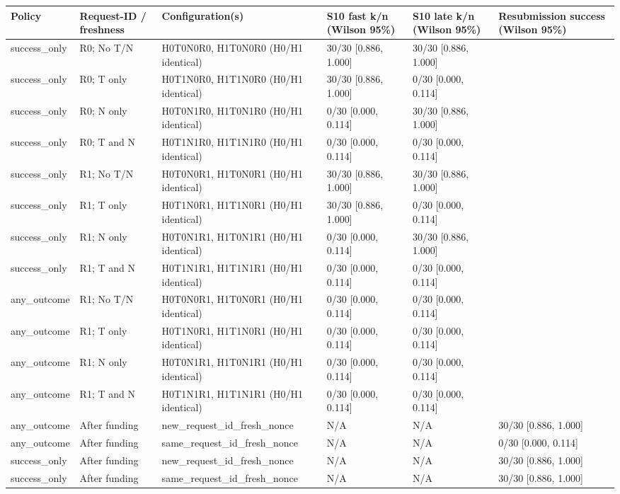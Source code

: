 \begin{table}[t]
\centering
\small
\setlength{\tabcolsep}{2pt}
\begin{tabular}{lp{0.68in}p{1.38in}p{1.30in}p{1.30in}p{1.15in}}
\toprule
Policy & Request-ID / freshness & Configuration(s) & S10 fast k/n (Wilson 95\%) & S10 late k/n (Wilson 95\%) & Resubmission success (Wilson 95\%) \\
\midrule
success\_only & R0; No T/N & H0T0N0R0, H1T0N0R0 (H0/H1 identical) & 30/30 [0.886, 1.000] & 30/30 [0.886, 1.000] &  \\
success\_only & R0; T only & H0T1N0R0, H1T1N0R0 (H0/H1 identical) & 30/30 [0.886, 1.000] & 0/30 [0.000, 0.114] &  \\
success\_only & R0; N only & H0T0N1R0, H1T0N1R0 (H0/H1 identical) & 0/30 [0.000, 0.114] & 30/30 [0.886, 1.000] &  \\
success\_only & R0; T and N & H0T1N1R0, H1T1N1R0 (H0/H1 identical) & 0/30 [0.000, 0.114] & 0/30 [0.000, 0.114] &  \\
success\_only & R1; No T/N & H0T0N0R1, H1T0N0R1 (H0/H1 identical) & 30/30 [0.886, 1.000] & 30/30 [0.886, 1.000] &  \\
success\_only & R1; T only & H0T1N0R1, H1T1N0R1 (H0/H1 identical) & 30/30 [0.886, 1.000] & 0/30 [0.000, 0.114] &  \\
success\_only & R1; N only & H0T0N1R1, H1T0N1R1 (H0/H1 identical) & 0/30 [0.000, 0.114] & 30/30 [0.886, 1.000] &  \\
success\_only & R1; T and N & H0T1N1R1, H1T1N1R1 (H0/H1 identical) & 0/30 [0.000, 0.114] & 0/30 [0.000, 0.114] &  \\
any\_outcome & R1; No T/N & H0T0N0R1, H1T0N0R1 (H0/H1 identical) & 0/30 [0.000, 0.114] & 0/30 [0.000, 0.114] &  \\
any\_outcome & R1; T only & H0T1N0R1, H1T1N0R1 (H0/H1 identical) & 0/30 [0.000, 0.114] & 0/30 [0.000, 0.114] &  \\
any\_outcome & R1; N only & H0T0N1R1, H1T0N1R1 (H0/H1 identical) & 0/30 [0.000, 0.114] & 0/30 [0.000, 0.114] &  \\
any\_outcome & R1; T and N & H0T1N1R1, H1T1N1R1 (H0/H1 identical) & 0/30 [0.000, 0.114] & 0/30 [0.000, 0.114] &  \\
any\_outcome & After funding & new\_request\_id\_fresh\_nonce & N/A & N/A & 30/30 [0.886, 1.000] \\
any\_outcome & After funding & same\_request\_id\_fresh\_nonce & N/A & N/A & 0/30 [0.000, 0.114] \\
success\_only & After funding & new\_request\_id\_fresh\_nonce & N/A & N/A & 30/30 [0.886, 1.000] \\
success\_only & After funding & same\_request\_id\_fresh\_nonce & N/A & N/A & 30/30 [0.886, 1.000] \\
\bottomrule
\end{tabular}
\end{table}
